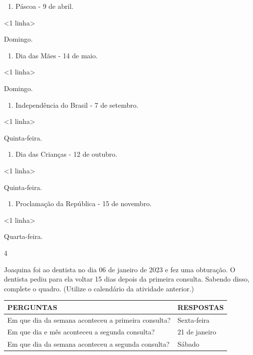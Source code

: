 {{{{{\begin{enumerate}
\def\labelenumi{\alph{enumi})}
\item
  Páscoa - 9 de abril.
\end{enumerate}

\textless{}1 linha\textgreater{}

Domingo.

\begin{enumerate}
\def\labelenumi{\alph{enumi})}
\item
  Dia das Mães - 14 de maio.
\end{enumerate}

\textless{}1 linha\textgreater{}

Domingo.

\begin{enumerate}
\def\labelenumi{\alph{enumi})}
\item
  Independência do Brasil - 7 de setembro.
\end{enumerate}

\textless{}1 linha\textgreater{}

Quinta-feira.

\begin{enumerate}
\def\labelenumi{\alph{enumi})}
\item
  Dia das Crianças - 12 de outubro.
\end{enumerate}

\textless{}1 linha\textgreater{}

Quinta-feira.

\begin{enumerate}
\def\labelenumi{\alph{enumi})}
\item
  Proclamação da República - 15 de novembro.
\end{enumerate}

\textless{}1 linha\textgreater{}

Quarta-feira.

\num{4}

Joaquina foi ao dentista no dia 06 de janeiro de 2023 e fez uma
obturação. O dentista pediu para ela voltar 15 dias depois da primeira
consulta. Sabendo disso, complete o quadro. (Utilize o calendário
da atividade anterior.)

\begin{longtable}[]{@{}ll@{}}
\toprule
PERGUNTAS & RESPOSTAS\tabularnewline
\midrule
\endhead
Em que dia da semana aconteceu a primeira consulta? & Sexta-feira\tabularnewline
Em que dia e mês aconteceu a segunda consulta? & 21 de
janeiro\tabularnewline
Em que dia da semana aconteceu a segunda consulta? &
Sábado\tabularnewline
\bottomrule
\end{longtable}

}}}}}
